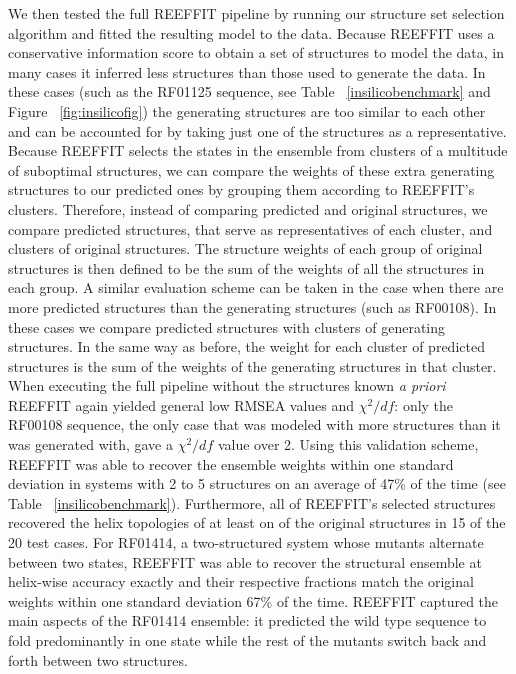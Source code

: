 \documentclass[12pt]{article}
\begin{document}
We then tested the full REEFFIT pipeline by running our structure set selection algorithm and fitted the resulting model to the data. 
Because REEFFIT uses a conservative information score to obtain a set of structures to model the data, in many cases it inferred less structures than those used to generate the data. 
In these cases (such as the RF01125 sequence, see Table ~\ref{insilicobenchmark} and Figure ~\ref{fig:insilicofig}) the generating structures are too similar to each other and can be accounted for by taking just one of the structures as a representative. 
Because REEFFIT selects the states in the ensemble from clusters of a multitude of suboptimal structures, we can compare the weights of these extra generating structures to our predicted ones by grouping them according to REEFFIT's clusters. 
Therefore, instead of comparing predicted and original structures, we compare predicted structures, that serve as representatives of each cluster, and clusters of original structures. 
The structure weights of each group of original structures is then defined to be the sum of the weights of all the structures in each group. 
A similar evaluation scheme can be taken in the case when there are more predicted structures than the generating structures (such as RF00108). 
In these cases we compare predicted structures with clusters of generating structures. In the same way as before, the weight for each cluster of predicted structures is the sum of the weights of the generating structures in that cluster. 
When executing the full pipeline without the structures known \textit{a priori} REEFFIT again yielded general low RMSEA values and $\chi^2/df$: only the RF00108 sequence, the only case that was modeled with more structures than it was generated with, gave a $\chi^2/df$ value over 2.  
Using this validation scheme, REEFFIT was able to recover the ensemble weights within one standard deviation in systems with 2 to 5 structures on an average of 47\% of the time (see Table ~\ref{insilicobenchmark}). 
Furthermore, all of REEFFIT's selected structures recovered the helix topologies of at least on of the original structures in 15 of the 20 test cases.
For RF01414, a two-structured system whose mutants alternate between two states, REEFFIT was able to recover the structural ensemble at helix-wise accuracy exactly and their respective fractions match the original weights within one standard deviation 67\% of the time.
REEFFIT captured the main aspects of the RF01414 ensemble: it predicted the wild type sequence to fold predominantly in one state while the rest of the mutants switch back and forth between two structures.
\end{document}
